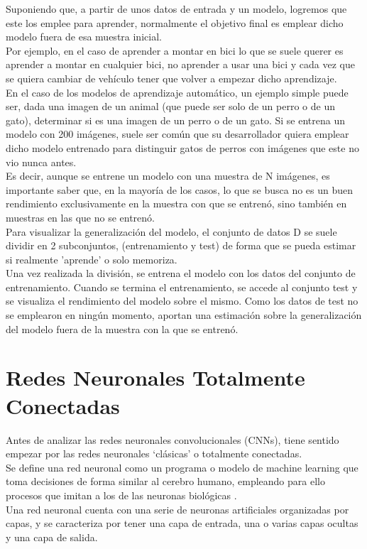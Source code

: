 Suponiendo que, a partir de unos datos de entrada y un modelo, logremos que este los emplee para aprender, normalmente el objetivo final es emplear dicho modelo fuera de esa muestra inicial. \\
Por ejemplo, en el caso de aprender a montar en bici lo que se suele querer es aprender a montar en cualquier bici, no aprender a usar una bici y cada vez que se quiera cambiar de vehículo tener que volver a empezar dicho aprendizaje. \\
En el caso de los modelos de aprendizaje automático, un ejemplo simple puede ser, dada una imagen de un animal (que puede ser solo de un perro o de un gato), determinar si es una imagen de un perro o de un gato. Si se entrena un modelo con 200 imágenes, suele ser común que su desarrollador quiera emplear dicho modelo entrenado para distinguir gatos de perros con imágenes que este no vio nunca antes. \\
Es decir, aunque se entrene un modelo con una muestra de N imágenes, es importante saber que, en la mayoría de los casos, lo que se busca no es un buen rendimiento exclusivamente en la muestra con que se entrenó, sino también en muestras en las que no se entrenó. \\
Para visualizar la generalización del modelo, el conjunto de datos D se suele dividir en 2 subconjuntos, (entrenamiento y test) de forma que se pueda estimar si realmente 'aprende' o solo memoriza.\\
Una vez realizada la división, se entrena el modelo con los datos del conjunto de entrenamiento. Cuando se termina el entrenamiento, se accede al conjunto test y se visualiza el rendimiento del modelo sobre el mismo. Como los datos de test no se emplearon en ningún momento, aportan una estimación sobre la generalización del modelo fuera de la muestra con la que se entrenó. 

\section{Redes Neuronales Totalmente Conectadas}

Antes de analizar las redes neuronales convolucionales (CNNs), tiene sentido empezar por las redes neuronales `clásicas' o totalmente conectadas. \\
Se define una red neuronal como un programa o modelo de machine learning que toma decisiones de forma similar al cerebro humano, empleando para ello procesos que imitan a los de las neuronas biológicas \cite{NN_intro}. \\
Una red neuronal cuenta con una serie de neuronas artificiales organizadas por capas, y se caracteriza por tener una capa de entrada, una o varias capas ocultas y una capa de salida.

